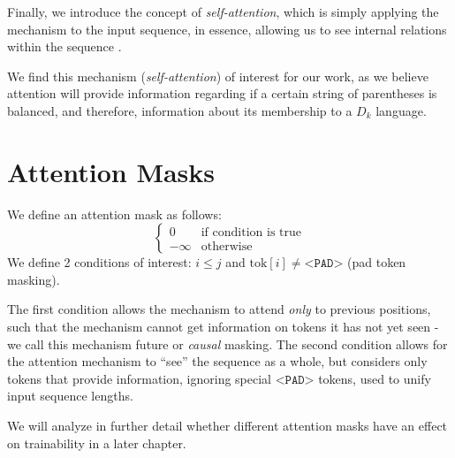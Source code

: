 Finally, we introduce the concept of \emph{self-attention}, which is simply applying the mechanism to the input sequence, in essence, allowing us to see internal relations within the sequence \cite{attention_is_all_you_need}.

We find this mechanism (\emph{self-attention}) of interest for our work, as we believe attention will provide information regarding if a certain string of parentheses is balanced, and therefore, information about its membership to a $D_k$ language.

\section{Attention Masks}
We define an attention mask as follows:
\begin{equation}
    \begin{cases}
         0 & \text{if condition is true}  \\
         -\infty & \text{otherwise}
    \end{cases}
\end{equation}
We define 2 conditions of interest: $i\leq j$ and $\text{tok}[i] \neq \texttt{<PAD>}$ (pad token masking).

The first condition allows the mechanism to attend \emph{only} to previous positions, such that the mechanism cannot get information on tokens it has not yet seen - we call this mechanism future or \emph{causal} masking.
The second condition allows for the attention mechanism to ``see'' the sequence as a whole, but considers only tokens that provide information, ignoring special $\texttt{<PAD>}$ tokens, used to unify input sequence lengths.

We will analyze in further detail whether different attention masks have an effect on trainability in a later chapter.
